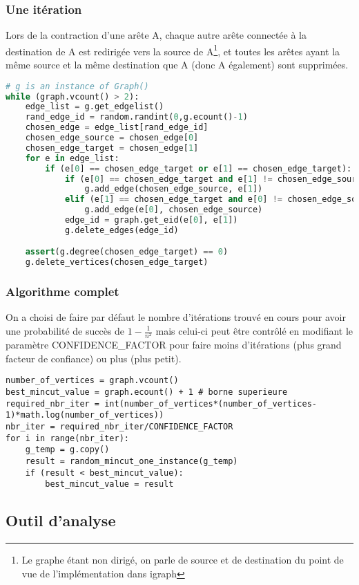 \documentclass[a4paper,10pt]{article}
\begin{document}
\subsubsection{Une itération}
Lors de la contraction d'une arête A, chaque autre arête connectée à la destination de A est redirigée vers la source de
A\footnote{Le graphe étant non dirigé, on parle de source et de destination du point de vue de l'implémentation dans igraph},
et toutes les arêtes ayant la même source et la même destination que A (donc A également) sont supprimées.
\begin{lstlisting}[language=Python]
# g is an instance of Graph()
while (graph.vcount() > 2):
	edge_list = g.get_edgelist()
	rand_edge_id = random.randint(0,g.ecount()-1)
	chosen_edge = edge_list[rand_edge_id]
	chosen_edge_source = chosen_edge[0]
	chosen_edge_target = chosen_edge[1]
	for e in edge_list:
		if (e[0] == chosen_edge_target or e[1] == chosen_edge_target):
			if (e[0] == chosen_edge_target and e[1] != chosen_edge_source):
				g.add_edge(chosen_edge_source, e[1])
			elif (e[1] == chosen_edge_target and e[0] != chosen_edge_source):
				g.add_edge(e[0], chosen_edge_source)
			edge_id = graph.get_eid(e[0], e[1])
			g.delete_edges(edge_id)

	assert(g.degree(chosen_edge_target) == 0)
	g.delete_vertices(chosen_edge_target)
\end{lstlisting}

\subsubsection{Algorithme complet}
On a choisi de faire par défaut le nombre d'itérations trouvé en cours pour avoir une probabilité de succès de
\begin{math} 1-\frac{1}{n^{2}} \end{math}
mais celui-ci peut être contrôlé en modifiant le paramètre CONFIDENCE\_FACTOR pour faire moins d'itérations (plus grand facteur de confiance) ou plus (plus petit).
\begin{lstlisting}
number_of_vertices = graph.vcount()
best_mincut_value = graph.ecount() + 1 # borne superieure
required_nbr_iter = int(number_of_vertices*(number_of_vertices-1)*math.log(number_of_vertices))
nbr_iter = required_nbr_iter/CONFIDENCE_FACTOR
for i in range(nbr_iter):
	g_temp = g.copy()
	result = random_mincut_one_instance(g_temp)
	if (result < best_mincut_value):
		best_mincut_value = result
\end{lstlisting}

\subsection{Outil d'analyse}
\end{document}
